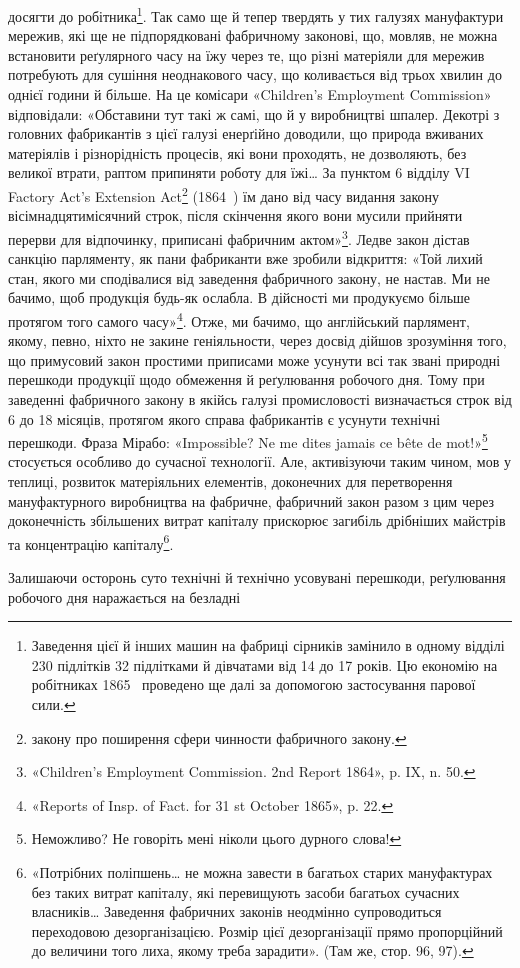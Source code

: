 \parcont{}  %
досягти до робітника\footnote{
Заведення цієї й інших машин на фабриці сірників замінило в
одному відділі  230 підлітків 32 підлітками й дівчатами від 14 до 17 років.
Цю економію на робітниках 1865~ проведено ще далі за допомогою застосування
парової сили.
}. Так само ще й тепер твердять у тих
галузях мануфактури мережив, які ще не підпорядковані фабричному
законові, що, мовляв, не можна встановити реґулярного
часу на їжу через те, що різні матеріяли для мережив потребують
для сушіння неоднакового часу, що коливається від трьох хвилин
до однієї години й більше. На це комісари «Children’s Employment
Commission» відповідали: «Обставини тут такі ж самі, що
й у виробництві шпалер. Декотрі з головних фабрикантів з цієї
галузі енерґійно доводили, що природа вживаних матеріялів і
різнорідність процесів, які вони проходять, не дозволяють, без великої
втрати, раптом припиняти роботу для їжі\dots{} За пунктом 6
відділу VI Factory Act’s Extension Act\footnote*{
закону про поширення сфери чинности фабричного закону. 
} (1864~) їм дано від
часу видання закону вісімнадцятимісячний строк, після скінчення
якого вони мусили прийняти перерви для відпочинку,
приписані фабричним актом»\footnote{
«Children’s Employment Commission. 2nd Report 1864», p. IX,
n. 50.
}. Ледве закон дістав санкцію
парляменту, як пани фабриканти вже зробили відкриття: «Той
лихий стан, якого ми сподівалися від заведення фабричного закону,
не настав. Ми не бачимо, щоб продукція будь-як ослабла.
В дійсності ми продукуємо більше протягом того самого часу»\footnote{
«Reports of Insp. of Fact. for 31 st October 1865», p. 22.
}.
Отже, ми бачимо, що англійський парлямент, якому, певно,
ніхто не закине геніяльности, через досвід дійшов зрозуміння
того, що примусовий закон простими приписами може усунути
всі так звані природні перешкоди продукції щодо обмеження
й реґулювання робочого дня. Тому при заведенні фабричного
закону в якійсь галузі промисловості визначається строк від 6
до 18 місяців, протягом якого справа фабрикантів є усунути
технічні перешкоди. Фраза Мірабо: «Impossible? Ne me dites
jamais ce bête de mot!»\footnote*{
Неможливо? Не говоріть мені ніколи цього дурного слова! 
} стосується особливо до сучасної технології.
Але, активізуючи таким чином, мов у теплиці, розвиток
матеріяльних елементів, доконечних для перетворення мануфактурного
виробництва на фабричне, фабричний закон разом з
цим через доконечність збільшених витрат капіталу прискорює
загибіль дрібніших майстрів та концентрацію капіталу\footnote{
«Потрібних поліпшень\dots{} не можна завести в багатьох старих
мануфактурах без таких витрат капіталу, які перевищують засоби багатьох
сучасних власників\dots{} Заведення фабричних законів неодмінно
супроводиться переходовою дезорганізацією. Розмір цієї дезорганізації
прямо пропорційний до величини того лиха, якому треба зарадити».
(Там же, стор. 96, 97).
}.

Залишаючи осторонь суто технічні й технічно усовувані
перешкоди, реґулювання робочого дня наражається на безладні
\parbreak{}  %
